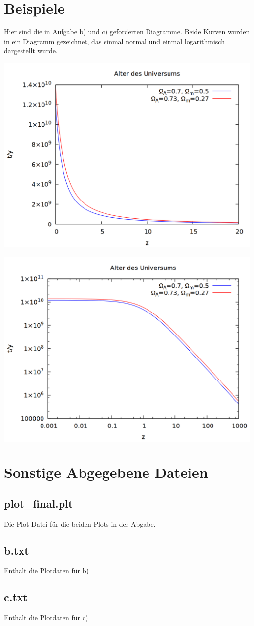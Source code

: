 \documentclass{scrartcl}
\begin{document}
\section*{Beispiele}
Hier sind die in Aufgabe b) und c) geforderten Diagramme. Beide Kurven wurden in ein Diagramm gezeichnet, das einmal normal und einmal logarithmisch dargestellt wurde.
\begin{center}
\includegraphics[scale=0.3]{plot_final} 
\end{center}
\begin{center}
\includegraphics[scale=0.3]{plot_log_final} 
\end{center}

\section*{Sonstige Abgegebene Dateien}
\subsection*{plot\_final.plt}
Die Plot-Datei für die beiden Plots in der Abgabe.
\subsection*{b.txt}
Enthält die Plotdaten für b)
\subsection*{c.txt}
Enthält die Plotdaten für c)
\end{document}
